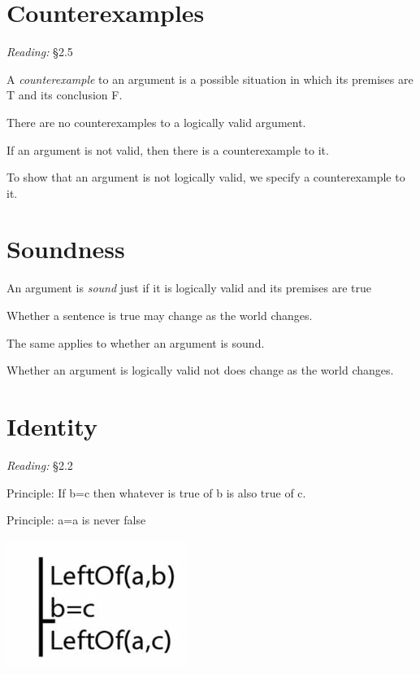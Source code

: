 \documentclass[12pt]{extarticle}
\begin{document}
\begin{multicols*}{3}
 
\section{Counterexamples}
 
\emph{Reading:} §2.5
 
A \emph{counterexample} to an argument is a possible situation in which its premises are T and its conclusion F.
 
There are no counterexamples to a logically valid argument.
 
If an argument is not valid, then there is a counterexample to it.
 
To show that an argument is not logically valid, we specify a counterexample to it.
 
 
 
\section{Soundness}
 
An argument is \emph{sound} just if it is logically valid and its premises are true
 
Whether a sentence is true may change as the world changes.
 
The same applies to whether an argument is sound.
 
Whether an argument is logically valid not does change as the world changes.
 
 
 
\section{Identity}
 
\emph{Reading:} §2.2
 
Principle: If b=c then whatever is true of b is also true of c.
 
Principle: a=a is never false
 
\begin{center}
\includegraphics[scale=0.3]{img/arg_identity.png}
\end{center}
\vfill
\begin{minipage}{\columnwidth}

\end{minipage}
\end{multicols*}
\end{document}
